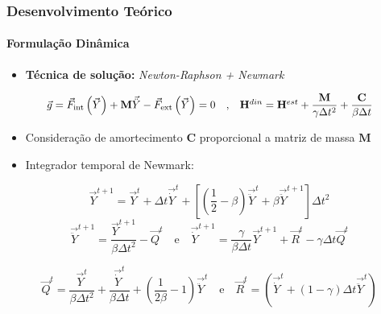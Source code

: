 \documentclass{beamer}
\begin{document}
\begin{frame}
    \frametitle{Desenvolvimento Teórico}
    \framesubtitle{Formulação Dinâmica}

    \begin{itemize}
        \item \textbf{Técnica de solução:} \textit{Newton-Raphson + Newmark}
    \end{itemize}

    \begin{equation}
        \scalebox{0.95}{$
        \vec{g} = \vec{F}_{\text{int}}\left(\vec{Y}\right) + \mathbf{M} \vec{\ddot{Y}} - \vec{F}_{\text{ext}}\left(\vec{Y}\right) = 0
        \quad\text{,}\quad 
        \mathbf{H}^{din} = \mathbf{H}^{est} + \dfrac{\mathbf{M}}{\gamma \Delta t^2} + \dfrac{\mathbf{C}}{\beta \Delta t}  
        $}
    \end{equation}

    
    \begin{itemize}
        \item Consideração de amortecimento \(\mathbf{C}\) proporcional a matriz de massa \(\mathbf{M}\)
        \item Integrador temporal de Newmark:
    \end{itemize}

    \begin{equation*}
        \vec{Y}^{t+1} = \vec{Y}^{t} + \Delta t \vec{\dot{Y}}^{t} + \left[\left(\dfrac{1}{2}-\beta\right)\vec{\ddot{Y}}^t + \beta \vec{\ddot{Y}}^{t+1} \right] \Delta t^2
    \end{equation*}
    \begin{equation*}
        \vec{\ddot{Y}}^{t+1} = \dfrac{\vec{Y}^{t+1}}{\beta \Delta t^2} - \vec{Q}^{t} 
        \quad \text{e} \quad  
        \vec{\dot{Y}}^{t+1} = \dfrac{\gamma}{\beta \Delta t} \vec{Y}^{t+1} + \vec{R}^{t} - \gamma \Delta t \vec{Q}^{t}
    \end{equation*}

    \begin{equation*}
        \vec{Q}^{t} = \frac{\vec{Y}^t}{\beta \Delta t^2} + \frac{\vec{\dot{Y}}^t}{\beta \Delta t} + \left( \frac{1}{2\beta} - 1 \right) \vec{\ddot{Y}}^t \quad \text{e} \quad \vec{R}^{t} = \left(\vec{\dot{Y}}^t + \left(1-\gamma\right)\Delta t \vec{\ddot{Y}}^t\right)
    \end{equation*}
\end{frame}
\end{document}
